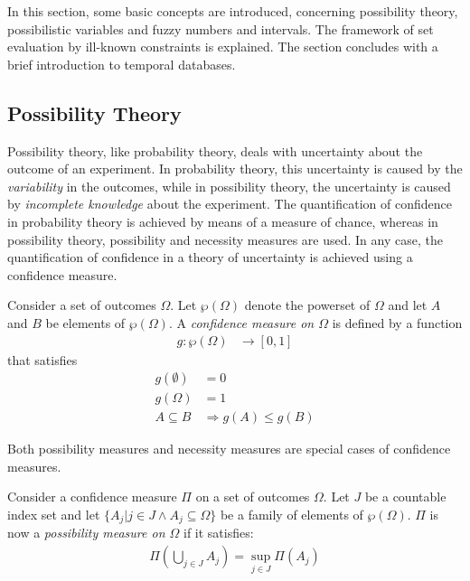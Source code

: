 In this section, some basic concepts are introduced, concerning possibility theory, possibilistic variables and fuzzy numbers and intervals. The framework of set evaluation by ill-known constraints\cite{Pon11} is explained. The section concludes with a brief introduction to temporal databases.

\subsection{\label{subsec:possibility-theory}Possibility Theory}
Possibility theory, like probability theory, deals with uncertainty about the outcome of an experiment. In probability theory, this uncertainty is caused by the \emph{variability} in the outcomes, while in possibility theory, the uncertainty is caused by \emph{incomplete knowledge} about the experiment. The quantification of confidence in probability theory is achieved by means of a measure of chance, whereas in possibility theory, possibility and necessity measures are used. In any case, the quantification of confidence in a theory of uncertainty is achieved using a confidence measure\cite{Shafer:1976:AMathematical}.

\begin{definition}
Consider a set of outcomes $\Omega$. Let $\wp(\Omega)$ denote the powerset of $\Omega$ and let $A$ and $B$ be elements of $\wp(\Omega)$. A \emph{confidence measure on $\Omega$} is defined by a function
	\begin{align}
	g : \wp(\Omega) & \rightarrow \left[0,1\right]
	\end{align}
that satisfies
	\begin{align}
	g(\emptyset) &= 0 \\
	g(\Omega) &= 1 	\label{NormalizationProperty} \\
	A \subseteq B &\Rightarrow g(A) \leq g(B) \label{MonotonicityProperty}
	\end{align}
\end{definition}

Both possibility measures and necessity measures are special cases of confidence measures.

\begin{definition}
Consider a confidence measure $\Pi$ on a set of outcomes $\Omega$. Let $J$ be a countable index set and let $\{ A_{j} | j \in J \wedge A_{j} \subseteq \Omega \}$ be a family of elements of $\wp(\Omega)$. $\Pi$ is now a \emph{possibility measure on $\Omega$} if it satisfies:
	\begin{align}
	\Pi\left(\bigcup_{j \in J} A_{j} \right) = \sup_{j \in J} \Pi(A_{j})
	\end{align}
\end{definition}

